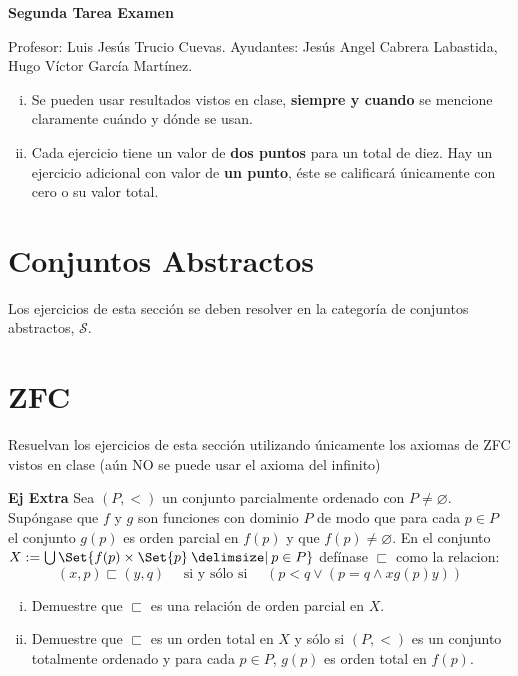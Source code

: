 \documentclass[11pt]{article}
\providecommand\st{\;|\;}
\newcommand\SetSymbol[1][]{%
    \nonscript\:#1\vert
    \allowbreak
    \nonscript\:
    \mathopen{}}
\renewcommand\st{\SetSymbol[\delimsize]}
\renewcommand\st{\SetSymbol[\delimsize]}
\newcommand{\topos}[1]{\mathscr{#1}}
\renewcommand{\emptyset}{\varnothing}
\begin{document}
    \begin{center}
      \Huge \textbf{Segunda Tarea Examen} \\
    \end{center}
    \begin{flushright}
      \footnotesize Profesor: Luis Jesús Trucio Cuevas. \hfill Ayudantes: Jesús Angel Cabrera Labastida,\\
      \hfill Hugo Víctor García Martínez.
    \end{flushright}
    \footnotesize
    \begin{enumerate}[i)]
      \item Se pueden usar resultados vistos en clase, \textbf{siempre y cuando} se mencione claramente cuándo y dónde se usan.
      \item Cada ejercicio tiene un valor de \textbf{dos puntos} para un total de diez. Hay un ejercicio adicional con valor de \textbf{un punto}, éste se calificará únicamente con cero o su valor total.
  \end{enumerate}\normalsize

    \section*{Conjuntos Abstractos}
    Los ejercicios de esta sección se deben resolver en la categoría de
    conjuntos abstractos, \(\topos{S}\).
    
    
    \section*{ZFC}
    Resuelvan los ejercicios de esta sección utilizando únicamente los axiomas de ZFC vistos en clase (aún NO se puede usar el axioma del infinito)
    
     \vspace{.5cm}

    \noindent \textbf{Ej Extra} Sea $(P,<)$ un conjunto parcialmente ordenado con $P \neq \emptyset$. Supóngase que $f$ y $g$ son funciones con dominio $P$ de modo que para cada $p \in P$ el conjunto $g(p)$ es orden parcial en $f(p)$ y que $f(p)\neq \emptyset$. En el conjunto $X:=\bigcup\Set{ f(p) \times \Set{p} \st p \in P  }$ defínase $\sqsubset$ como la relacion:
    \[ (x,p) \sqsubset (y,q) \quad \text{ si y sólo si } \quad \left( p < q \lor \left( p=q \land x \mathrel{g(p)} y  \right) \right) \]
    \begin{enumerate}[i)]
      \item Demuestre que $\sqsubset$ es una relación de orden parcial en $X$.
      \item Demuestre que $\sqsubset$ es un orden total en $X$ y sólo si $(P,<)$ es un conjunto totalmente ordenado y para cada $p \in P$, $g(p)$ es orden total en $f(p)$.
    \end{enumerate}

\end{document}

